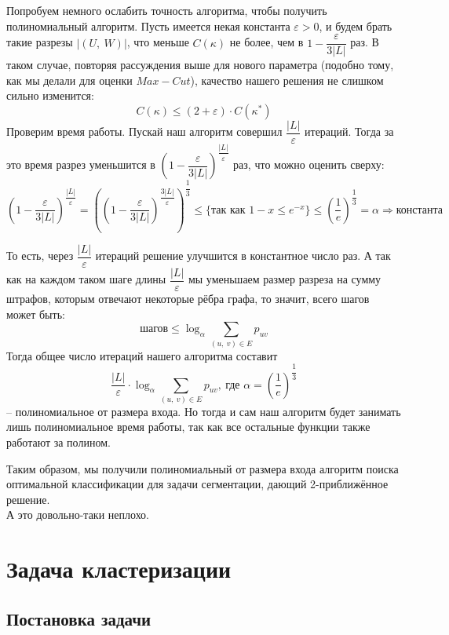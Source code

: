 \documentclass[a4paper,12pt]{article}
\begin{document}
Попробуем немного ослабить точность алгоритма, чтобы получить полиномиальный алгоритм. Пусть имеется некая константа $\varepsilon > 0$, и будем брать такие разрезы $|(U,\ W)|$, что меньше $C(\kappa)$ не более, чем в $1 - \dfrac{\varepsilon}{3|L|}$ раз. В таком случае, повторяя рассуждения выше для нового параметра (подобно тому, как мы делали для оценки $Max-Cut$), качество нашего решения не слишком сильно изменится:
\[C(\kappa) \leqslant (2 + \varepsilon) \cdot C(\kappa^*)\]
Проверим время работы. Пускай наш алгоритм совершил $\dfrac{|L|}{\varepsilon}$ итераций. Тогда за это время разрез уменьшится в $\displaystyle\left(1 - \dfrac{\varepsilon}{3|L|}\right)^{\dfrac{|L|}{\varepsilon}}$ раз, что можно оценить сверху:
\[\displaystyle\left(1 - \dfrac{\varepsilon}{3|L|}\right)^{\dfrac{|L|}{\varepsilon}} = \displaystyle\left(\left(1 - \dfrac{\varepsilon}{3|L|}\right)^{\dfrac{3|L|}{\varepsilon}}\right)^{\dfrac{1}{3}} \leqslant \{\text{так как }1 - x \leqslant e^{-x}\}\leqslant \left(\dfrac{1}{e}\right)^{\dfrac{1}{3}} = \alpha \Rightarrow \text{константа}\]

То есть, через $\dfrac{|L|}{\varepsilon}$ итераций решение улучшится в константное число раз. А так как на каждом таком шаге длины $\dfrac{|L|}{\varepsilon}$ мы уменьшаем размер разреза на сумму штрафов, которым отвечают некоторые рёбра графа, то значит, всего шагов может быть:
\[\text{шагов} \leqslant \displaystyle\log_{\displaystyle\alpha}\sum\limits_{(u,\ v) \in E}p_{uv}\]
Тогда общее число итераций нашего алгоритма составит
\[\dfrac{|L|}{\varepsilon}\cdot\displaystyle\log_{\displaystyle\alpha}\sum\limits_{(u,\ v) \in E}p_{uv},\ \text{где }\alpha = \left(\dfrac{1}{e}\right)^{\dfrac{1}{3}}\]
-- полиномиальное от размера входа. Но тогда и сам наш алгоритм будет занимать лишь полиномиальное время работы, так как все остальные функции также работают за полином.

Таким образом, мы получили полиномиальный от размера входа алгоритм поиска оптимальной классификации для задачи сегментации, дающий 2-приближённое решение.\\ А это довольно-таки неплохо.

\newpage
\section{Задача кластеризации}

\subsection{Постановка задачи}
\end{document}
